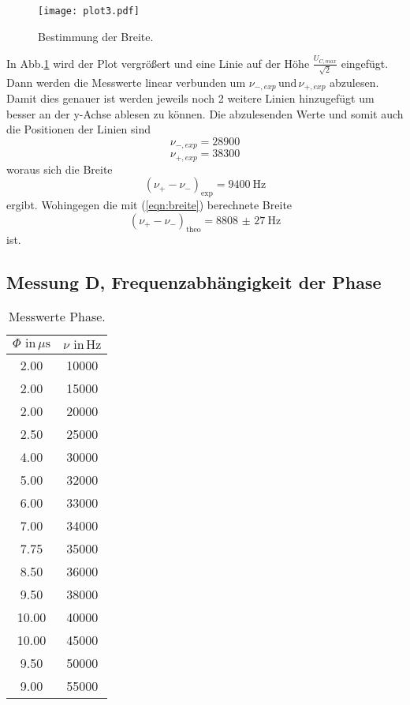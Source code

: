 \begin{figure}
  \centering
  \texttt{[image: plot3.pdf]}
  \caption{Bestimmung der Breite.}
  \label{fig:plot3}
\end{figure}

In Abb.\ref{fig:plot3} wird der Plot vergrößert und eine Linie auf der Höhe
$\frac{U_{C,max}}{\sqrt{2}}$ eingefügt. Dann werden die Messwerte linear
verbunden um $\nu_{-,exp}\, \text{und}\,\nu_{+,exp}$ abzulesen. Damit dies
genauer ist werden jeweils noch 2 weitere Linien hinzugefügt um besser an der y-Achse
ablesen zu können.
Die abzulesenden Werte und somit auch die Positionen der Linien sind
\begin{equation*}
  \nu_{-,exp} = 28900
\end{equation*}
\begin{equation*}
  \nu_{+,exp} = 38300
\end{equation*}
woraus sich die Breite
\begin{equation*}
  (\nu_{+}-\nu_{-})_{\text{exp}} = \SI{9400}{\hertz}
\end{equation*}
ergibt. Wohingegen die mit (\ref{eqn:breite}) berechnete Breite
\begin{equation*}
  (\nu_{+}-\nu_{-})_{\text{theo}} = \SI{8808(27)}{\hertz}
\end{equation*}
ist.

\subsection{Messung D, Frequenzabhängigkeit der Phase}

\begin{table}[h]
  \centering
  \label{tab:Uc2}
  \begin{tabular}{ c c }
    \toprule
    {$\Phi \,\, \text{in} \,\si{\mu\second}$}
   &{$\nu \,\, \text{in} \,\si{\hertz}$} \\

    \midrule
    2.00    & 10000 \\
    2.00    & 15000 \\
    2.00    & 20000 \\
    2.50    & 25000 \\
    4.00    & 30000 \\
    5.00    & 32000 \\
    6.00    & 33000 \\
    7.00    & 34000 \\
    7.75    & 35000 \\
    8.50    & 36000 \\
    9.50    & 38000 \\
    10.00   & 40000 \\
    10.00   & 45000 \\
    9.50    & 50000 \\
    9.00    & 55000 \\


    \bottomrule
  \end{tabular}
  \caption{Messwerte Phase.}
\end{table}

